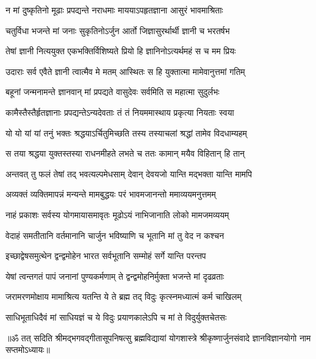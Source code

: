 \twolineshloka
{न मां दुष्कृतिनो मूढाः प्रपद्यन्ते नराधमाः}
{माययाऽपहृतज्ञाना आसुरं भावमाश्रिताः}%

\twolineshloka
{चतुर्विधा भजन्ते मां जनाः सुकृतिनोऽर्जुन}
{आर्तो जिज्ञासुरर्थार्थी ज्ञानी च भरतर्षभ}%

\twolineshloka
{तेषां ज्ञानी नित्ययुक्त एकभक्तिर्विशिष्यते}
{प्रियो हि ज्ञानिनोऽत्यर्थमहं स च मम प्रियः}%

\twolineshloka
{उदाराः सर्व एवैते ज्ञानी त्वात्मैव मे मतम्}
{आस्थितः स हि युक्तात्मा मामेवानुत्तमां गतिम्}%

\twolineshloka
{बहूनां जन्मनामन्ते ज्ञानवान् मां प्रपद्यते}
{वासुदेवः सर्वमिति स महात्मा सुदुर्लभः}%

\twolineshloka
{कामैस्तैस्तैर्हृतज्ञानाः प्रपद्यन्तेऽन्यदेवताः}
{तं तं नियममास्थाय प्रकृत्या नियताः स्वया}%

\twolineshloka
{यो यो यां यां तनुं भक्तः श्रद्धयाऽर्चितुमिच्छति}
{तस्य तस्याचलां श्रद्धां तामेव विदधाम्यहम्}%

\twolineshloka
{स तया श्रद्धया युक्तस्तस्या राधनमीहते}
{लभते च ततः कामान् मयैव विहितान् हि तान्}%

\twolineshloka
{अन्तवत् तु फलं तेषां तद् भवत्यल्पमेधसाम्}
{देवान् देवयजो यान्ति मद्भक्ता यान्ति मामपि}%

\twolineshloka
{अव्यक्तं व्यक्तिमापन्नं मन्यन्ते मामबुद्धयः}
{परं भावमजानन्तो ममाव्ययमनुत्तमम्}%

\twolineshloka
{नाहं प्रकाशः सर्वस्य योगमायासमावृतः}
{मूढोऽयं नाभिजानाति लोको मामजमव्ययम्}%

\twolineshloka
{वेदाहं समतीतानि वर्तमानानि चार्जुन}
{भविष्याणि च भूतानि मां तु वेद न कश्चन}%

\twolineshloka
{इच्छाद्वेषसमुत्थेन द्वन्द्वमोहेन भारत}
{सर्वभूतानि सम्मोहं सर्गे यान्ति परन्तप}%

\twolineshloka
{येषां त्वन्तगतं पापं जनानां पुण्यकर्मणाम्}
{ते द्वन्द्वमोहनिर्मुक्ता भजन्ते मां दृढव्रताः}%

\twolineshloka
{जरामरणमोक्षाय मामाश्रित्य यतन्ति ये}
{ते ब्रह्म तद् विदुः कृत्स्नमध्यात्मं कर्म चाखिलम्}%

\twolineshloka
{साधिभूताधिदैवं मां साधियज्ञं च ये विदुः}
{प्रयाणकालेऽपि च मां ते विदुर्युक्तचेतसः}%

{॥ॐ तत् सदिति श्रीमद्भगवद्गीतासूपनिषत्सु ब्रह्मविद्यायां योगशास्त्रे श्रीकृष्णार्जुनसंवादे ज्ञानविज्ञानयोगो नाम सप्तमोऽध्यायः॥}


